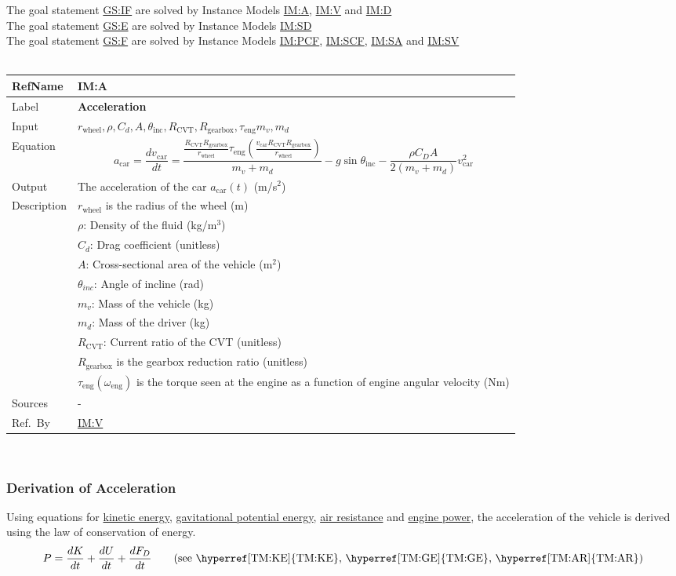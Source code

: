 \documentclass[12pt]{article}
\newcommand{\colAwidth}{0.13\textwidth}
\newcommand{\colBwidth}{0.82\textwidth}
\newcommand{\hpref}[1]{\hyperref[#1]{#1}}
\newcommand{\definstance}[8] {
~\newline
\noindent
\begin{minipage}{\textwidth}
\renewcommand*{\arraystretch}{1.5}
\begin{tabular}{| p{\colAwidth} | p{\colBwidth}|}
  \hline
  \rowcolor[gray]{0.9}
  RefName& \textbf{#1} \label{#1}\\
  \hline
  Label& \bf #2 \\
  \hline
  Input& #3\\
  \hline
  Equation& #4\\
  \hline
  Output& #5\\
  \hline
  Description& #6 \\
  \hline
  Sources& #7 \\
  \hline
  Ref.\ By & #8\\
  \hline
\end{tabular}
\end{minipage}\\
}
\begin{document}
{\noindent}The goal statement \hpref{GS:IF} are solved by Instance Models \hpref{IM:A}, \hpref{IM:V} and \hpref{IM:D}\\
{\noindent}The goal statement \hpref{GS:E} are solved by Instance Models \hpref{IM:SD}\\
The goal statement \hpref{GS:F} are solved by Instance Models \hpref{IM:PCF}, \hpref{IM:SCF}, \hpref{IM:SA} and \hpref{IM:SV}\\
  \definstance
  {IM:A}
  {Acceleration}
  {$r_{\text{wheel}}, \rho, C_d, A, \theta_{\text{inc}}, R_{\text{CVT}}, R_\text{gearbox}, \tau_\text{eng} m_v, m_d$}
  {
    \[a_\text{car} = \frac{dv_\text{car}}{dt} = \frac{\frac{R_{\text{CVT}} R_\text{gearbox}}{r_\text{wheel}} \tau_\text{eng}(\frac{v_\text{car} R_{\text{CVT}} R_\text{gearbox}}{r_\text{wheel}})}{m_v + m_d} - g\sin{\theta_\text{inc}} - \frac{\rho C_D A}{2(m_v + m_d)} v_\text{car}^2 \]
  }
  {The acceleration of the car $a_\text{car}(t)$ (m/s$^2$)}
  {
  $r_{\text{wheel}}$ is the radius of the wheel (m)\\
  & $\rho$: Density of the fluid (kg/m$^3$)\\
  & $C_d$: Drag coefficient (unitless)\\
  & $A$: Cross-sectional area of the vehicle (m$^2$)\\
  & $\theta_{inc}$: Angle of incline (rad)\\
  & $m_v$: Mass of the vehicle (kg)\\
  & $m_d$: Mass of the driver (kg)\\
  & $R_{\text{CVT}}$: Current ratio of the CVT (unitless)\\
  & $R_\text{gearbox}$ is the gearbox reduction ratio (unitless)\\
  & $\tau_{\text{eng}}(\omega_\text{eng})$ is the torque seen at the engine as a function of engine angular velocity (Nm)
}
{-}
{\hpref{IM:V}}
  
  
\subsubsection*{Derivation of Acceleration}

Using equations for \hyperref[TM:KE]{kinetic energy}, \hyperref[TM:GE]{gavitational potential energy}, \hyperref[TM:AR]{air resistance} and \hyperref[TM:ET]{engine power}, the acceleration of the vehicle is derived using the law of conservation of energy.
\[
P = \frac{dK}{dt} + \frac{dU}{dt} + \frac{dF_D}{dt} \tag*{\text{(see \hpref{TM:KE}, \hpref{TM:GE}, \hpref{TM:AR})}}
\]
\end{document}
